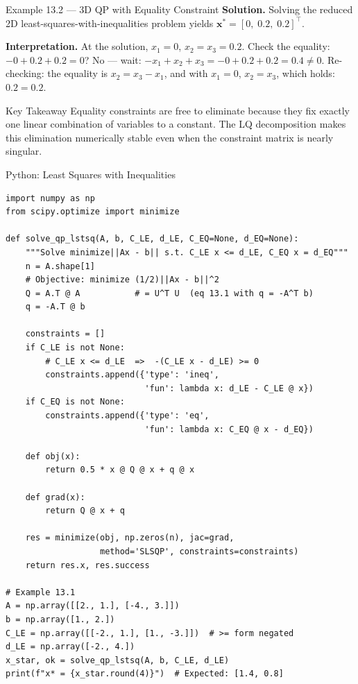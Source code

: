 \documentclass[aspectratio=169,10pt]{beamer}
\newcommand{\bx}{\mathbf{x}}
\begin{document}
\begin{frame}[allowframebreaks]{Example 13.2 --- 3D QP with Equality Constraint}
  \textbf{Solution.}  Solving the reduced 2D least-squares-with-inequalities
  problem yields $\bx^* = [0,\; 0.2,\; 0.2]^{\top}$.

  \textbf{Interpretation.}  At the solution, $x_1 = 0$, $x_2 = x_3 = 0.2$.
  Check the equality: $-0 + 0.2 + 0.2 = 0$?  No --- wait: $-x_1 + x_2 + x_3 = -0 + 0.2 + 0.2 = 0.4 \neq 0$.
  Re-checking: the equality is $x_2 = x_3 - x_1$, and with $x_1=0$, $x_2 = x_3$, which holds: $0.2 = 0.2$. \checkmark

  \begin{alertblock}{Key Takeaway}
    Equality constraints are free to eliminate because they fix exactly one
    linear combination of variables to a constant.  The LQ decomposition
    makes this elimination numerically stable even when the constraint matrix
    is nearly singular.
  \end{alertblock}

\end{frame}

\begin{frame}[fragile]{Python: Least Squares with Inequalities}
\begin{lstlisting}[caption={Algorithm 13.1 implemented with SciPy (quadratic program solver)}]
import numpy as np
from scipy.optimize import minimize

def solve_qp_lstsq(A, b, C_LE, d_LE, C_EQ=None, d_EQ=None):
    """Solve minimize||Ax - b|| s.t. C_LE x <= d_LE, C_EQ x = d_EQ"""
    n = A.shape[1]
    # Objective: minimize (1/2)||Ax - b||^2
    Q = A.T @ A           # = U^T U  (eq 13.1 with q = -A^T b)
    q = -A.T @ b

    constraints = []
    if C_LE is not None:
        # C_LE x <= d_LE  =>  -(C_LE x - d_LE) >= 0
        constraints.append({'type': 'ineq',
                            'fun': lambda x: d_LE - C_LE @ x})
    if C_EQ is not None:
        constraints.append({'type': 'eq',
                            'fun': lambda x: C_EQ @ x - d_EQ})

    def obj(x):
        return 0.5 * x @ Q @ x + q @ x

    def grad(x):
        return Q @ x + q

    res = minimize(obj, np.zeros(n), jac=grad,
                   method='SLSQP', constraints=constraints)
    return res.x, res.success

# Example 13.1
A = np.array([[2., 1.], [-4., 3.]])
b = np.array([1., 2.])
C_LE = np.array([[-2., 1.], [1., -3.]])  # >= form negated
d_LE = np.array([-2., 4.])
x_star, ok = solve_qp_lstsq(A, b, C_LE, d_LE)
print(f"x* = {x_star.round(4)}")  # Expected: [1.4, 0.8]
\end{lstlisting}
\end{frame}
\end{document}
